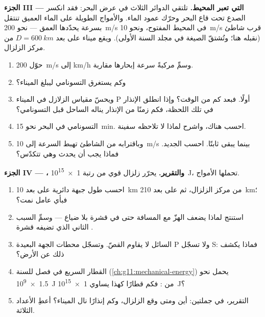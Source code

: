 \begin{problem}
\medskip
\noindent\textbf{الجزء III ---  التي تعبر المحيط.}
تلتقي الدوائر الثلاث في عرض البحر: فقد انكسر الصدع تحت قاع البحر
وحرّك عمود الماء. والأمواج الطويلة على الماء العميق تنتقل
بسرعة يحدّدها العمق --- نحو \qty{200}{m/s} في المحيط المفتوح،
ونحو \qty{10}{m/s} قرب شاطئ (نقبله هنا؛ وتُشتقّ الصيغة
في مجلد السنة الأولى). ويقع ميناء على بعد $D = \qty{600}{km}$ من
مركز الزلزال.
\begin{enumerate}[resume]
  \item حوّل \qty{200}{m/s} إلى \unit{km/h} وسمِّ مركبةً
        سرعة إبحارها مقاربة.
  \item وكم يستغرق التسونامي ليبلغ الميناء؟
  \item ويحسّ مقياس الزلازل في الميناء  P أولًا. فبعد كم
        من الوقت؟ وإذا انطلق الإنذار في تلك اللحظة، فكم زمنًا من
        الإنذار يناله الساحل قبل التسونامي؟
  \item {} التسونامي في البحر نحو \qty{15}{min}. احسب
         هناك، واشرح لماذا لا تلاحظه سفينة.
  \item وباقترابه من الشاطئ تهبط السرعة إلى \qty{10}{m/s} بينما
        يبقى  ثابتًا. احسب  الجديد. فماذا يجب أن
        يحدث  وهي تتكدّس؟
\end{enumerate}

\medskip
\noindent\textbf{الجزء IV --- ، والتقرير.}
يحرّر زلزال قوي من رتبة \qty{1e15}{J}، تحملها
الأمواج.
\begin{enumerate}[resume]
  \item احسب طول جبهة  دائرية على بعد \qty{10}{km} من
        مركز الزلزال، ثم على بعد \qty{210}{km}؛ فبأي عامل نمت؟
  \item استنتج لماذا يضعف الهزّ مع المسافة حتى في قشرة
        بلا ضياع --- وسمِّ السبب الثاني الذي تضيفه قشرة .
  \item السائل لا يقاوم القصّ. وتسجّل محطات الجهة البعيدة 
        P ولا تسجّل  S: فماذا يكشف ذلك عن  الأرض؟
  \item القطار السريع في فصل  للسنة 
        (\cref{ch:g11:mechanical-energy}) يحمل نحو \qty{1.5e9}{J}
        من : فكم قطارًا كهذا يساوي \qty{1e15}{J}؟
  \item التقرير، في جملتين: أين ومتى وقع الزلزال،
        وكم إنذارًا نال الميناء؟ أعطِ الأعداد الثلاثة.
\end{enumerate}
\end{problem}

